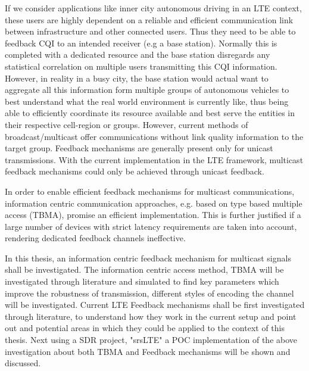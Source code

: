 \documentclass{article}
\begin{document}
If we consider applications like inner city autonomous driving in an LTE context, these users are highly dependent on a reliable and efficient communication link between infrastructure and other connected users. Thus they need to be able to feedback \ac{CQI} to an intended receiver (e.g a base station). Normally this is completed with a dedicated resource and the base station disregards any statistical correlation on multiple users transmitting this \ac{CQI} information. However, in reality in a busy city, the base station would actual want to aggregate all this information form multiple groups of autonomous vehicles to best understand what the real world environment is currently like, thus being able to efficiently coordinate its resource available and best serve the entities in their respective cell-region or groups. However, current methods of broadcast/multicast offer communications without link quality information to the target group. Feedback mechanisms are generally present only for unicast transmissions. With the current implementation in the LTE framework, multicast feedback mechanisms could only be achieved through unicast feedback.

In order to enable efficient feedback mechanisms for multicast communications, information centric communication approaches, e.g. based on type based multiple access (TBMA)\cite{tbma}, promise an efficient implementation. This is further justified if a large number of devices with strict latency requirements are taken into account, rendering dedicated feedback channels ineffective. 

In this thesis, an information centric feedback mechanism for multicast signals shall be investigated. The information centric access method, \ac{TBMA}  will be investigated through literature and simulated to find key parameters which improve the robustness of transmission, different styles of encoding the channel will be investigated. 
Current LTE Feedback mechanisms shall be first investigated through literature, to understand how they work in the current setup and point out and potential areas in which they could be applied to the context of this thesis. Next using a SDR project, "srsLTE" a \ac{POC} implementation of the above investigation about both \ac{TBMA} and Feedback mechanisms will be shown and discussed. 
\end{document}
